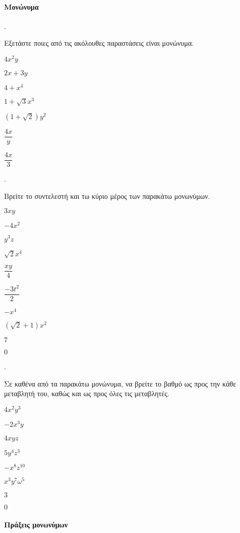 \documentclass[11pt,a4paper,twocolumn]{article}
\newcounter{askhsh}
\newcommand{\askhsh}{{\large\theaskhsh.}\ \addtocounter{askhsh}{1}}
\begin{document}
\paragraph{Μονώνυμα}
\askhsh Εξετάστε ποιες από τις ακόλουθες παραστάσεις είναι μονώνυμα.
\begin{multicols}{2}
\begin{alist}
\item $4x^2y$
\item $2x+3y$
\item $4+x^4$
\item $1+\sqrt{3}x^3$
\item $\left(1+\sqrt{2}\right)y^2$
\item $\dfrac{4x}{y}$
\item $\dfrac{4x}{3}$
\end{alist}
\end{multicols}
\askhsh Βρείτε το συντελεστή και τω κύριο μέρος των παρακάτω μονωνύμων.
\begin{multicols}{3}
\begin{alist}
\item $3xy$
\item $-4x^2$
\item $y^3z$
\item $\sqrt{2}x^4$
\item $\dfrac{xy}{4}$
\item $\dfrac{-3t^2}{2}$
\item $-x^4$
\item $\left(\sqrt{2}+1\right)x^2$
\item $7$
\item $0$
\end{alist}
\end{multicols}
\askhsh Σε καθένα από τα παρακάτω μονώνυμα, να βρείτε το βαθμό ως προς την κάθε μεταβλητή του, καθώς και ως προς όλες τις μεταβλητές.
\begin{multicols}{2}
\begin{alist}
\item $4x^2y^3$
\item $-2x^3y$
\item $4xyz$
\item $5y^4z^3$
\item $-x^8z^{10}$
\item $x^3y^7\omega^5$
\item $3$
\item $0$
\end{alist}
\end{multicols}
\paragraph{Πράξεις μονωνύμων}
\end{document}
